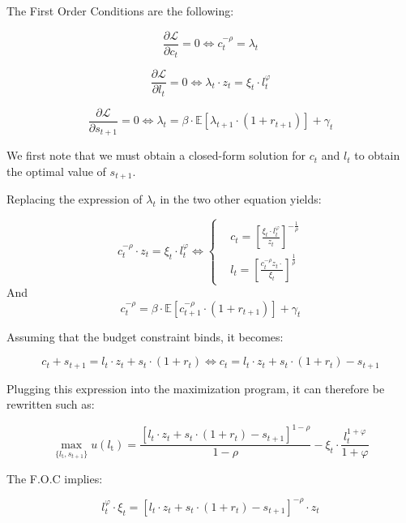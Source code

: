 \documentclass{article}
\begin{document}
The First Order Conditions are the following:


$$\frac{\partial \mathcal{L}}{\partial c_{t}} = 0 \iff c_{t}^{-\rho} = \lambda_{t}$$


$$\frac{\partial \mathcal{L}}{\partial l_{t}} = 0 \iff \lambda_{t}\cdot z_{t} = \xi_{t}\cdot l_{t}^{\varphi}$$


$$\frac{\partial \mathcal{L}}{\partial s_{t+1}} = 0 \iff \lambda_{t} = \beta \cdot \mathbb{E}\left[\lambda_{t+1}\cdot (1+r_{t+1})\right] + \gamma_{t}$$

We first note that we must obtain a closed-form solution for $c_{t}$ and $l_{t}$ to obtain 
the optimal value of $s_{t+1}$. 

Replacing the expression of $\lambda_{t}$ in the two other equation yields: 

\begin{equation}
    c^{-\rho}_{t}\cdot z_{t} = \xi_{t}\cdot l_{t}^{\varphi} \iff
        \begin{cases}
        & c_t = \left[\frac{\xi_{t}\cdot l_{t}^{\varphi}}{z_{t}}\right]^{-\frac{1}{\rho}}\\ 
        & l_{t} = \left[\frac{c_{t}^{-\rho}z_{t}\cdot}{\xi_{t}}\right]^{\frac{1}{\rho}}
    \end{cases}
\end{equation}
And 
\begin{equation}
    c^{-\rho}_{t} = \beta \cdot \mathbb{E}\left[c^{-\rho}_{t+1}\cdot (1+r_{t+1})\right] + \gamma_{t}
\end{equation}

Assuming that the budget constraint binds, it becomes: 

$$c_{t} + s_{t+1} = l_{t}\cdot z_{t} + s_{t}\cdot(1+r_{t})
\iff 
c_{t} = l_{t}\cdot z_{t} + s_{t}\cdot(1+r_{t}) - s_{t+1} 
$$

Plugging this expression into the maximization program, 
it can therefore be rewritten such as: 

\begin{equation}
    \max_{\{l_{\text{t}},s_{t+1}\}} u(l_{\text{t}}) = \frac{\left[l_{t}\cdot z_{t} + s_{t}\cdot (1+r_{t}) - s_{t+1} \right]^{1-\rho}}{1-\rho}-
\xi_{t}\cdot\frac{l_{t}^{1+\varphi}}{1+\varphi}
\end{equation}

The F.O.C implies: 

\begin{equation}
    l_{t}^{\varphi}\cdot \xi_{t} = \left[l_{t}\cdot z_{t} + s_{t}\cdot(1+r_{t})- s_{t+1}\right]^{-\rho}\cdot z_{t}
\end{equation}
\end{document}
